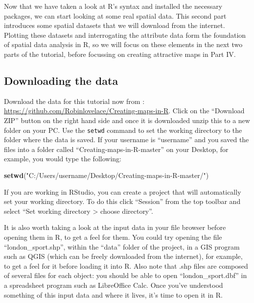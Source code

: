 \documentclass[]{article}
\newenvironment{Shaded}{}{}
\newcommand{\KeywordTok}[1]{\textcolor[rgb]{0.00,0.44,0.13}{\textbf{{#1}}}}
\newcommand{\StringTok}[1]{\textcolor[rgb]{0.25,0.44,0.63}{{#1}}}
\newcommand{\NormalTok}[1]{{#1}}
\begin{document}
Now that we have taken a look at R's syntax and installed the necessary
packages, we can start looking at some real spatial data. This second
part introduces some spatial datasets that we will download from the
internet. Plotting these datasets and interrogating the attribute data
form the foundation of spatial data analysis in R, so we will focus on
these elements in the next two parts of the tutorial, before focussing
on creating attractive maps in Part IV.

\subsection{Downloading the data}\label{downloading-the-data}

Download the data for this tutorial now from :
\href{https://github.com/Robinlovelace/Creating-maps-in-R}{\url{https://github.com/Robinlovelace/Creating-maps-in-R}}.
Click on the ``Download ZIP'' button on the right hand side and once it
is downloaded unzip this to a new folder on your PC. Use the
\texttt{setwd} command to set the working directory to the folder where
the data is saved. If your username is ``username'' and you saved the
files into a folder called ``Creating-maps-in-R-master'' on your
Desktop, for example, you would type the following:

\begin{Shaded}
\begin{Highlighting}[]
\KeywordTok{setwd}\NormalTok{(}\StringTok{"C:/Users/username/Desktop/Creating-maps-in-R-master/"}\NormalTok{)}
\end{Highlighting}
\end{Shaded}

If you are working in RStudio, you can create a project that will
automatically set your working directory. To do this click ``Session''
from the top toolbar and select ``Set working directory \textgreater{}
choose directory''.

It is also worth taking a look at the input data in your file browser
before opening them in R, to get a feel for them. You could try opening
the file ``london\_sport.shp'', within the ``data'' folder of the
project, in a GIS program such as QGIS (which can be freely downloaded
from the internet), for example, to get a feel for it before loading it
into R. Also note that .shp files are composed of several files for each
object: you should be able to open ``london\_sport.dbf'' in a
spreadsheet program such as LibreOffice Calc. Once you've understood
something of this input data and where it lives, it's time to open it in
R.
\end{document}
